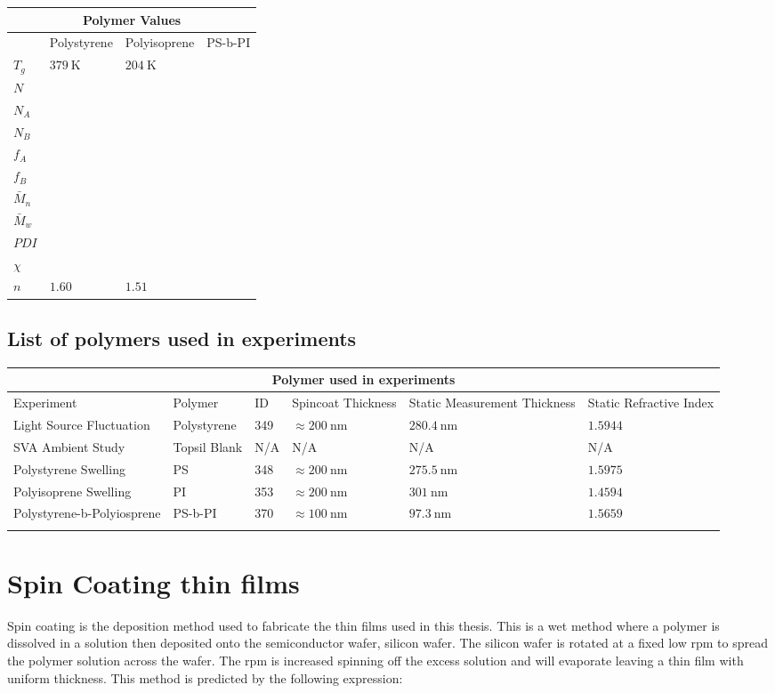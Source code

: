 \documentclass[MasterThesisMain.tex]{subfiles}
\begin{document}
\begin{tabular}{ |p{3cm}||p{3cm}|p{3cm}|p{3cm}|  }
 \hline
 \multicolumn{4}{|c|}{Polymer Values} \\
 \hline
    & Polystyrene & Polyisoprene & PS-b-PI\\
 \hline
 $T_g$& $\SI{379}{\kelvin}$   & $\SI{204}{\kelvin}$  &   \\
 $N$&  &  &  \\
 $N_A$&  &  &  \\
 $N_B$&  &  &  \\
 $f_A$&  &  &  \\
 $f_B$&  &  &  \\
 $\bar{M}_n$&  &  &  \\
 $\bar{M}_w$&  &  &  \\
 $PDI$&  &  &  \\
 $\chi$&  &  &  \\
 $n$& $1.60$ & $1.51$ &\\
 \hline
\end{tabular}

\subsection{List of polymers used in experiments}

\begin{tabular}{ |p{3cm}||p{2cm}|p{2cm}|p{2cm}|p{2cm}|p{2cm}|  }
 \hline
 \multicolumn{6}{|c|}{Polymer used in experiments} \\
 \hline
 Experiment & Polymer & ID & Spincoat Thickness & Static Measurement Thickness & Static Refractive Index\\
 \hline
 Light Source Fluctuation & Polystyrene & 349 & $\approx\SI{200}{\nano\meter}$ & $\SI{280.4}{\nano\meter}$ & $1.5944$  \\
 SVA Ambient Study & Topsil Blank & N/A & N/A & N/A & N/A  \\
 Polystyrene Swelling & PS  & 348  & $\approx\SI{200}{\nano\meter}$ & $\SI{275.5}{\nano\meter}$ & $1.5975$  \\
 Polyisoprene Swelling & PI  & 353 & $\approx\SI{200}{\nano\meter}$ & $\SI{301}{\nano\meter}$ & $1.4594$  \\
 Polystyrene-b-Polyiosprene & PS-b-PI & 370 & $\approx\SI{100}{\nano\meter}$ & $\SI{97.3}{\nano\meter}$ & $1.5659$  \\
 \hline
 \label{tab:polymers}
\end{tabular}

\section{Spin Coating thin films}
Spin coating is the deposition method used to fabricate the thin films used in this thesis. This is a wet method where a polymer is dissolved in a solution then deposited onto the semiconductor wafer, silicon wafer. The silicon wafer is rotated at a fixed low rpm to spread the polymer solution across the wafer. The rpm is increased spinning off the excess solution and will evaporate leaving a thin film with uniform thickness. This method is predicted by the following expression:
\end{document}
